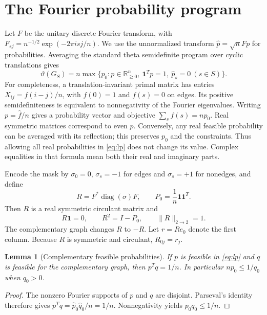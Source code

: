 \documentclass[11pt]{article}
\newtheorem{lemma}[theorem]{Lemma}
\theoremstyle{remark}\newtheorem{remark}[theorem]{Remark}
\newcommand{\R}{\mathbb R}
\newcommand{\one}{\mathbf 1}
\newcommand{\tht}{\vartheta}
\newcommand{\sgn}{\sigma}
\begin{document}
\section{The Fourier probability program}
Let $F$ be the unitary discrete Fourier transform, with
$F_{sj}=n^{-1/2}\exp(-2\pi i sj/n)$. We use the unnormalized transform
$\widehat p=\sqrt n Fp$ for probabilities. Averaging the standard theta
semidefinite program over cyclic translations gives
\begin{equation}\label{eq:lp}
 \tht(G_S)=n\max\{p_0:p\in\R^n_{\ge0},\ 
 \one^Tp=1,\ \widehat p_s=0\ (s\in S)\}.
\end{equation}
For completeness, a translation-invariant primal matrix has entries
$X_{ij}=f(i-j)/n$, with $f(0)=1$ and $f(s)=0$ on edges. Its positive
semidefiniteness is equivalent to nonnegativity of the Fourier eigenvalues.
Writing $p=\widehat f/n$ gives a probability vector and objective
$\sum_s f(s)=np_0$. Real symmetric matrices correspond to even $p$.
Conversely, any real feasible probability can be averaged with its reflection;
this preserves $p_0$ and the constraints. Thus allowing all real probabilities
in \eqref{eq:lp} does not change its value. Complex equalities in that formula
mean both their real and imaginary parts.

Encode the mask by $\sgn_0=0$, $\sgn_s=-1$ for edges and $\sgn_s=+1$
for nonedges, and define
\begin{equation}\label{eq:R}
 R=F^*\operatorname{diag}(\sgn)F,\qquad
 P_0=\frac1n\one\one^T.
\end{equation}
Then $R$ is a real symmetric circulant matrix and
\begin{equation}\label{eq:Ridentities}
 R\one=0,\qquad R^2=I-P_0,\qquad \|R\|_{2\to2}=1.
\end{equation}
The complementary graph changes $R$ to $-R$. Let $r=Re_0$ denote the first
column. Because $R$ is symmetric and circulant, $R_{0j}=r_j$.

\begin{lemma}[Complementary feasible probabilities]\label{lem:orthogonal}
If $p$ is feasible in \eqref{eq:lp} and $q$ is feasible for the complementary
graph, then $p^Tq=1/n$. In particular $np_0\le1/q_0$ when $q_0>0$.
\end{lemma}
\begin{proof}
The nonzero Fourier supports of $p$ and $q$ are disjoint. Parseval's identity
therefore gives $p^Tq=\widehat p_0\widehat q_0/n=1/n$. Nonnegativity yields
$p_0q_0\le1/n$.
\end{proof}
\end{document}
